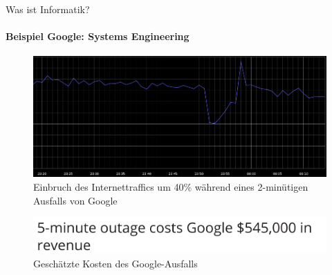      \begin{frame}{Was ist Informatik?}
        \framesubtitle{Beispiel Google: Systems Engineering}
        \begin{figure}
            \includegraphics[width=\linewidth,height=0.3\textheight,keepaspectratio]{chapters/02_computer_science/figures/google/downtime/downtime.png}
            \caption{Einbruch des Internettraffics um 40\% während eines 2-minütigen Ausfalls von Google \cite{google:down:chart}}
            \label{fig:my_label}
        \end{figure}
        
         \begin{figure}
            \includegraphics[width=0.4\linewidth,height=0.3\textheight,keepaspectratio]{chapters/02_computer_science/figures/google/downtime/costs.png}
            \caption{Geschätzte Kosten des Google-Ausfalls \cite{google:down:costs}}
            \label{fig:my_label}
        \end{figure}
    \end{frame}
    
